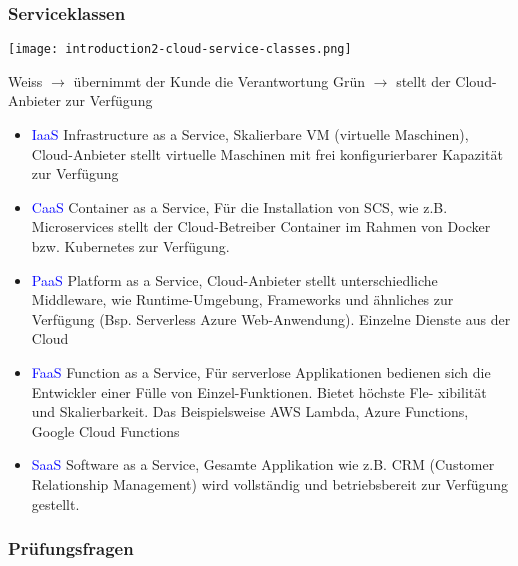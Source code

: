 \subsubsection{Serviceklassen}

\texttt{[image: introduction2-cloud-service-classes.png]}

Weiss $\rightarrow$ übernimmt der Kunde die Verantwortung
Grün $\rightarrow$ stellt der Cloud-Anbieter zur Verfügung \\

\begin{itemize}
    \item \textcolor{blue}{IaaS} Infrastructure as a Service, Skalierbare VM (virtuelle Maschinen), Cloud-Anbieter stellt virtuelle Maschinen mit frei konfigurierbarer Kapazität zur Verfügung
    \item \textcolor{blue}{CaaS} Container as a Service, Für die Installation von SCS, wie z.B. Microservices stellt der Cloud-Betreiber Container im Rahmen von Docker bzw. Kubernetes zur Verfügung.
    \item \textcolor{blue}{PaaS} Platform as a Service, Cloud-Anbieter stellt unterschiedliche Middleware, wie Runtime-Umgebung, Frameworks und ähnliches zur Verfügung (Bsp. Serverless Azure Web-Anwendung). Einzelne Dienste aus der Cloud
    \item \textcolor{blue}{FaaS} Function as a Service, Für serverlose Applikationen bedienen sich die Entwickler einer Fülle von Einzel-Funktionen. Bietet höchste Fle-
    xibilität und Skalierbarkeit. Das Beispielsweise AWS Lambda, Azure Functions, Google Cloud Functions
    \item \textcolor{blue}{SaaS} Software as a Service, Gesamte Applikation wie z.B. CRM (Customer Relationship Management) wird vollständig und betriebsbereit zur Verfügung gestellt.
\end{itemize}

\columnbreak
\subsubsection{Prüfungsfragen}

